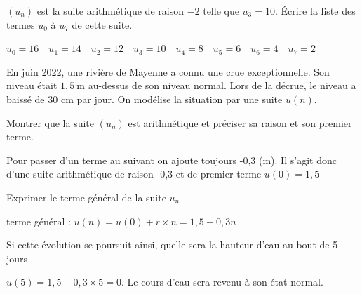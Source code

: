 \documentclass[11pt,a4paper]{article}  %
\begin{document}
$\left(u_n\right)$ est la suite arithmétique de raison $-2$ telle que $u_3=10$.
Écrire la liste des termes $u_0$ à $u_7$ de cette suite.

\begin{corrBox}
	$u_0=16 \quad u_1=14 \quad u_2=12 \quad u_3=10 \quad u_4=8 \quad u_5=6 \quad u_6=4 \quad u_7=2$	
\end{corrBox}



En juin 2022, une rivière de Mayenne a connu une crue exceptionnelle.
Son niveau était $1,5 \mathrm{~m}$ au-dessus de son niveau normal.
Lors de la décrue, le niveau a baissé de 30 cm par jour. On modélise la situation par une suite $u(n)$.
\begin{enumMet}
	\item Montrer que la suite $\left(u_n\right)$ est arithmétique et préciser sa raison et son premier terme.
	\begin{corrBox}
		Pour passer d'un terme au suivant on ajoute toujours -0,3 (m). Il s'agit donc d'une suite arithmétique de raison -0,3 et de premier terme $u(0)=1,5$	
	\end{corrBox}
	\item Exprimer le terme général de la suite $u_n$
	\begin{corrBox}
		terme général : $u(n)=u(0)+r\times n=1,5-0,3n$
	\end{corrBox}
	\item Si cette évolution se poursuit ainsi, quelle sera la hauteur d'eau au bout de 5 jours
	\begin{corrBox}
		$u(5)=1,5-0,3\times 5=0$. Le cours d'eau sera revenu à son état normal.	
	\end{corrBox}
\end{enumMet}
\end{document}
